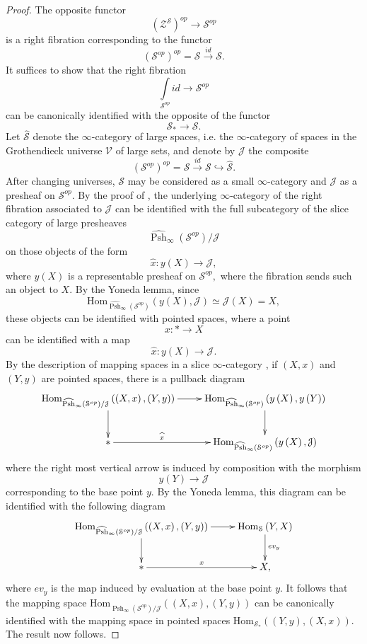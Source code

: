 \documentclass[12pt]{amsart}
\theoremstyle{definition}
\newcommand{\cJ}{\mathcal{J}}
\newcommand{\cS}{\mathcal{S}}
\newcommand{\cV}{\mathcal{V}}
\newcommand{\cZ}{\mathcal{Z}}
\newcommand{\Hom}{\mathrm{Hom}}
\renewcommand{\i}{\infty}
\def\LPshi{\widehat{\operatorname{Psh}}_\i}
\begin{document}
\begin{proof}
The opposite functor $$\left(\cZ^\cS\right)^{op} \to \cS^{op}$$ is a right fibration corresponding to the functor $$\left(\cS^{op}\right)^{op}=\cS \stackrel{id}{\longrightarrow} \cS.$$ It suffices to show that the right fibration $$\underset{\cS^{op}} \int id \to \cS^{op}$$ can be canonically identified with the opposite of the functor $$\cS_{\ast} \to \cS.$$ Let $\widehat{\cS}$ denote the $\i$-category of large spaces, i.e. the $\i$-category of spaces in the Grothendieck universe $\cV$ of large sets, and denote by $\cJ$ the composite $$\left(\cS^{op}\right)^{op}=\cS \stackrel{id}{\longrightarrow} \cS \hookrightarrow \widehat{\cS}.$$ After changing universes, $\cS$ may be considered as a small $\i$-category and $\cJ$ as a presheaf on $\cS^{op}.$ By the proof of \cite[Corollary 5.3.5.4]{htt}, the underlying $\i$-category of the right fibration associated to $\cJ$ can be identified with the full subcategory of the slice category of large presheaves $$\LPshi\left(\cS^{op}\right)/\cJ$$ on those objects of the form $$\widehat{x}:y\left(X\right) \to \cJ,$$ where $y\left(X\right)$ is a representable presheaf on $\cS^{op},$ where the fibration sends such an object to $X.$ By the Yoneda lemma, since $$\Hom_{\LPshi\left(\cS^{op}\right)}\left(y\left(X\right),\cJ\right)\simeq \cJ\left(X\right)=X,$$ these objects can be identified with pointed spaces, where a point $$x:* \to X$$ can be identified with a map $$\widehat{x}:y\left(X\right) \to \cJ.$$ By the description of mapping spaces in a slice $\i$-category \cite[Proposition 5.5.5.12]{htt}, if $\left(X,x\right)$ and $\left(Y,y\right)$ are pointed spaces, there is a pullback diagram
$$\xymatrix{\Hom_{\LPshi\left(\cS^{op}\right)/\cJ}\left(\left(X,x\right),\left(Y,y\right)\right) \ar[r] \ar[d] & \Hom_{\LPshi\left(\cS^{op}\right)}\left(y\left(X\right),y\left(Y\right)\right) \ar[d]\\
\ast \ar[r]^-{\widehat{x}} & \Hom_{\LPshi\left(\cS^{op}\right)}\left(y\left(X\right),\cJ\right)}$$
where the right most vertical arrow is induced by composition with the morphism $$y\left(Y\right) \to \cJ$$ corresponding to the base point $y$. By the Yoneda lemma, this diagram can be identified with the following diagram
$$\xymatrix{\Hom_{\LPshi\left(\cS^{op}\right)/\cJ}\left(\left(X,x\right),\left(Y,y\right)\right) \ar[r] \ar[d] & \Hom_{\cS}\left(Y,X\right) \ar^-{ev_y}[d]\\
\ast \ar[r]^-{x} & X,}$$
where $ev_y$ is the map induced by evaluation at the base point $y.$ It follows that the mapping space $\Hom_{\LPshi\left(\cS^{op}\right)/\cJ}\left(\left(X,x\right),\left(Y,y\right)\right)$ can be canonically identified with the mapping space in pointed spaces $\Hom_{\cS_*}\left(\left(Y,y\right),\left(X,x\right)\right).$ The result now follows.
\end{proof}
\end{document}
